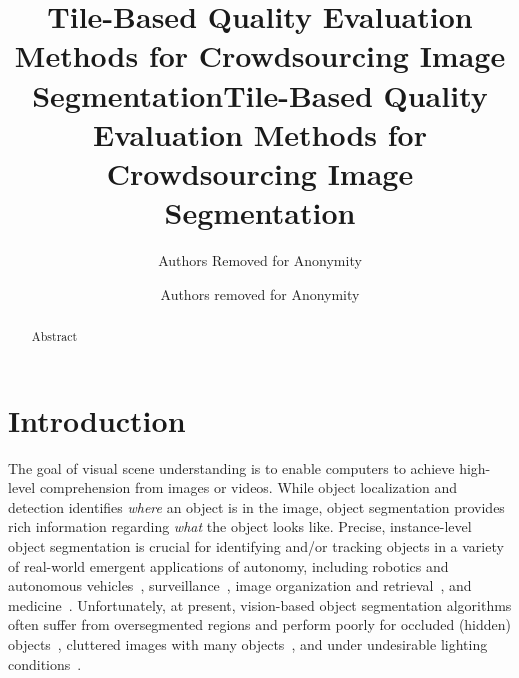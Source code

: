 \documentclass[letterpaper]{article} %
\title{Tile-Based Quality Evaluation Methods for Crowdsourcing Image Segmentation}
\author{Authors Removed for Anonymity}
\begin{document}
\title{Tile-Based Quality Evaluation Methods for Crowdsourcing Image Segmentation}
\author{Authors removed for Anonymity}
\maketitle
\begin{abstract}
Abstract
\end{abstract}

\section{Introduction}

\par The goal of visual scene understanding is 
to enable computers to achieve high-level comprehension 
from images or videos. While object localization and detection 
identifies \textit{where} an object is in the image, 
object segmentation provides rich information 
regarding \textit{what} the object looks like. 
Precise, instance-level object segmentation  
is crucial for identifying and/or tracking objects in a variety
of real-world emergent applications of autonomy, including
robotics and autonomous vehicles~\cite{XXX},
surveillance~\cite{xxx}, image organization and retrieval~\cite{Yamaguchi2012},
and medicine~\cite{Irshad2014}.
Unfortunately, at present, vision-based object segmentation
algorithms often suffer from oversegmented regions and perform poorly
for occluded (hidden) objects~\cite{Torralba2010},
cluttered images with many objects~\cite{Russakovsky2015},
and under undesirable lighting conditions~\cite{bell15minc}.
\end{document}
